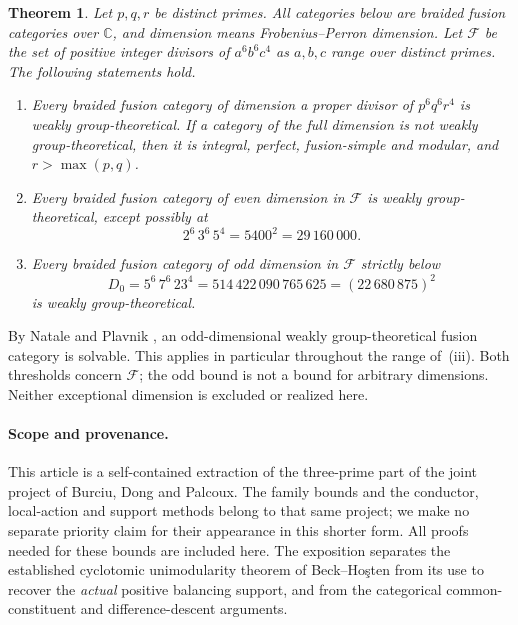 \documentclass[11pt,a4paper]{article}
\numberwithin{equation}{section}
\newtheorem{theorem}{Theorem}[section]
\newcommand{\Ffamily}{\mathscr F}
\begin{document}
\begin{theorem}\label{thm:main}
Let $p,q,r$ be distinct primes. All categories below are braided fusion
categories over $\mathbb C$, and dimension means Frobenius--Perron
dimension. Let $\Ffamily$ be the set of positive integer divisors of
$a^6b^6c^4$ as $a,b,c$ range over distinct primes.
The following statements hold.
\begin{enumerate}[label=\textup{(\roman*)},leftmargin=*]
\item Every braided fusion category of dimension a proper divisor of
$p^6q^6r^4$ is weakly group-theoretical. If a category of the full
dimension is not weakly group-theoretical, then it is integral,
perfect, fusion-simple and modular, and $r>\max(p,q)$.
\item Every braided fusion category of even dimension in $\Ffamily$
is weakly group-theoretical, except possibly at
\[
                  2^6\,3^6\,5^4=5400^2=29\,160\,000.
\]
\item Every braided fusion category of odd dimension in $\Ffamily$
strictly below
\[
       D_0=5^6\,7^6\,23^4=514\,422\,090\,765\,625
                         =(22\,680\,875)^2
\]
is weakly group-theoretical.
\end{enumerate}
\end{theorem}

By Natale and Plavnik \cite[Proposition~7.1]{NPdegrees}, an odd-dimensional
weakly group-theoretical fusion category is solvable. This applies in
particular throughout the range of~\textup{(iii)}. Both thresholds concern
$\Ffamily$; the odd bound is not a bound for arbitrary dimensions.
Neither exceptional dimension is excluded or realized here.

\paragraph{Scope and provenance.}
This article is a self-contained extraction of the three-prime part of the
joint project of Burciu, Dong and Palcoux. The family bounds and the
conductor, local-action and support methods belong to that same project;
we make no separate priority claim for their appearance in this shorter
form. All proofs needed for these bounds are included here. The exposition
separates the established cyclotomic unimodularity theorem of
Beck--Ho\c{s}ten \cite[Theorem~13]{BH} from its use to recover the
\emph{actual} positive balancing support, and from the categorical
common-constituent and difference-descent arguments.
\end{document}
